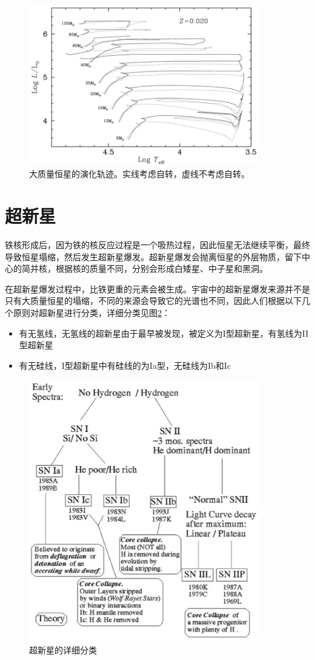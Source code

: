 \documentclass[openany]{ctexbook}
\begin{document}
\begin{figure}[hbt]
  \centering
  \includegraphics[width=10cm]{chapters/15/massive}
  \caption{大质量恒星的演化轨迹。实线考虑自转，虚线不考虑自转。}
  \label{}
\end{figure}

\section{超新星}
铁核形成后，因为铁的核反应过程是一个吸热过程，因此恒星无法继续平衡，最终导致恒星塌缩，然后发生超新星爆发。超新星爆发会抛离恒星的外层物质，留下中心的简并核，根据核的质量不同，分别会形成白矮星、中子星和黑洞。

在超新星爆发过程中，比铁更重的元素会被生成。宇宙中的超新星爆发来源并不是只有大质量恒星的塌缩，不同的来源会导致它的光谱也不同，因此人们根据以下几个原则对超新星进行分类，详细分类见图\ref{fig:supernova}：
\begin{itemize}
  \item 有无氢线，无氢线的超新星由于最早被发现，被定义为I型超新星，有氢线为II型超新星
  \item 有无硅线，I型超新星中有硅线的为Ia型，无硅线为Ib和Ic
\end{itemize}

\begin{figure}[hbt]
  \centering
  \includegraphics[width=10cm]{chapters/15/supernova}
  \caption{超新星的详细分类}
  \label{fig:supernova}
\end{figure}
\end{document}
